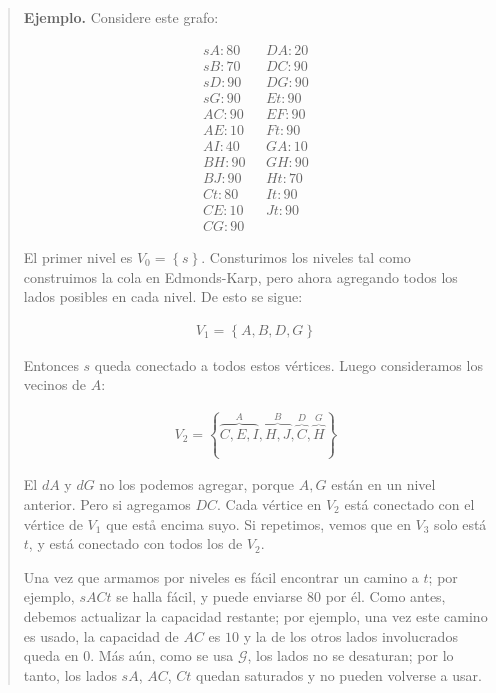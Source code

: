 \documentclass[a4paper]{article}
\begin{document}
\small
\begin{quote}

\textbf{Ejemplo.} Considere este grafo: 

\begin{align*}
    sA : 80~ ~ ~& DA : 20 \\ 
    sB : 70~ ~ ~& DC : 90 \\
    sD : 90~ ~ ~& DG : 90 \\
    sG : 90~ ~ ~& Et : 90 \\
    AC : 90~ ~ ~& EF : 90 \\
    AE : 10~ ~ ~& Ft : 90 \\
    AI : 40~ ~ ~& GA : 10 \\
    BH : 90~ ~ ~& GH : 90 \\
    BJ : 90~ ~ ~& Ht : 70 \\
    Ct : 80~ ~ ~& It : 90 \\
    CE : 10~ ~ ~& Jt : 90 \\
    CG : 90~ ~ ~&
\end{align*}

El primer nivel es $V_0 = \left\{ s \right\} $. Consturimos los niveles tal como construimos la cola en Edmonds-Karp, pero ahora agregando todos los lados posibles en cada nivel. De esto se sigue: 

\begin{align*}
    V_1 = \left\{ A, B, D, G \right\} 
\end{align*}

Entonces $s$ queda conectado a todos estos vértices. Luego consideramos los vecinos de $A$: 

\begin{align*}
    V_2 = \left\{ \overbrace{C, E, I}^{A}, \overbrace{H, J}^{B}, \overbrace{C}^{D}, \overbrace{H}^{G} \right\} 
\end{align*}

El $dA$ y $dG$ no los podemos agregar, porque $A, G$ están en un nivel
anterior. Pero si agregamos $DC$. Cada vértice en $V_2$ está conectado con el
vértice de $V_1$ que estå encima suyo. Si repetimos, vemos que en $V_3$  solo
está $t$, y está conectado con todos los de $V_2$.

Una vez que armamos por niveles es fácil encontrar un camino a $t$; por
ejemplo, $sACt$ se halla fácil, y puede enviarse $80$ por él. Como antes,
debemos actualizar la capacidad restante; por ejemplo, una vez este camino es
usado, la capacidad de $AC$ es $10$ y la de los otros lados involucrados queda
en $0$. Más aún, como se usa $\mathscr{G}$, los lados no se desaturan; por lo tanto,
los lados $sA$, $AC$, $Ct$ quedan saturados y no pueden volverse a usar.


\end{quote}
\end{document}
